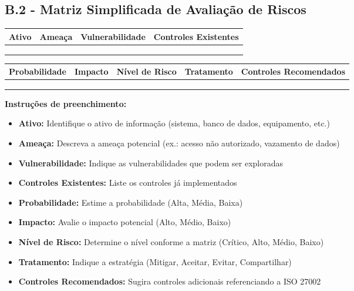 \documentclass[12pt,a4paper]{report}
\begin{document}
\subsection{B.2 - Matriz Simplificada de Avaliação de Riscos}

\begin{tcolorbox}[colback=boxcolor,colframe=sectioncolor,arc=2mm,title=\textbf{MATRIZ DE AVALIAÇÃO DE RISCOS DE SEGURANÇA DA INFORMAÇÃO}]

\begin{tabular}{|p{3.5cm}|p{3.5cm}|p{3.5cm}|p{3.5cm}|}
\hline
\textbf{Ativo} & \textbf{Ameaça} & \textbf{Vulnerabilidade} & \textbf{Controles Existentes} \\
\hline
\hline
& & & \\
\hline
& & & \\
\hline
& & & \\
\hline
\end{tabular}

\vspace{0.5cm}

\begin{tabular}{|p{2cm}|p{2cm}|p{2cm}|p{3cm}|p{4cm}|}
\hline
\textbf{Probabilidade} & \textbf{Impacto} & \textbf{Nível de Risco} & \textbf{Tratamento} & \textbf{Controles Recomendados} \\
\hline
\hline
& & & & \\
\hline
& & & & \\
\hline
& & & & \\
\hline
\end{tabular}

\textbf{Instruções de preenchimento:}

\begin{itemize}
  \item \textbf{Ativo:} Identifique o ativo de informação (sistema, banco de dados, equipamento, etc.)
  \item \textbf{Ameaça:} Descreva a ameaça potencial (ex.: acesso não autorizado, vazamento de dados)
  \item \textbf{Vulnerabilidade:} Indique as vulnerabilidades que podem ser exploradas
  \item \textbf{Controles Existentes:} Liste os controles já implementados
  \item \textbf{Probabilidade:} Estime a probabilidade (Alta, Média, Baixa)
  \item \textbf{Impacto:} Avalie o impacto potencial (Alto, Médio, Baixo)
  \item \textbf{Nível de Risco:} Determine o nível conforme a matriz (Crítico, Alto, Médio, Baixo)
  \item \textbf{Tratamento:} Indique a estratégia (Mitigar, Aceitar, Evitar, Compartilhar)
  \item \textbf{Controles Recomendados:} Sugira controles adicionais referenciando a ISO 27002
\end{itemize}
\end{tcolorbox}
\end{document}
